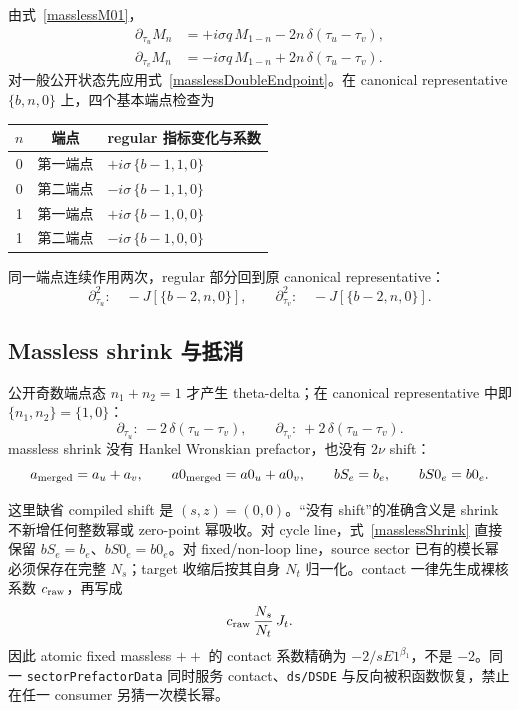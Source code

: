 ﻿\documentclass[a4paper,11pt]{article}
\begin{document}
由式~\eqref{masslessM01}，
\begin{align}
 \partial_{\tau_u}M_n
 &=+i\sigma q\,M_{1-n}
   -2n\,\delta(\tau_u-\tau_v),\\
 \partial_{\tau_v}M_n
 &=-i\sigma q\,M_{1-n}
   +2n\,\delta(\tau_u-\tau_v).
 \label{masslessTimeRules}
\end{align}
对一般公开状态先应用式~\eqref{masslessDoubleEndpoint}。在 canonical representative $\{b,n,0\}$ 上，四个基本端点检查为
\begin{center}
\begin{tabular}{ccl}
\toprule
$n$ & 端点 & regular 指标变化与系数\\
\midrule
0 & 第一端点 & $+i\sigma\,\{b-1,1,0\}$\\
0 & 第二端点 & $-i\sigma\,\{b-1,1,0\}$\\
1 & 第一端点 & $+i\sigma\,\{b-1,0,0\}$\\
1 & 第二端点 & $-i\sigma\,\{b-1,0,0\}$\\
\bottomrule
\end{tabular}
\end{center}
同一端点连续作用两次，regular 部分回到原 canonical representative：
\begin{equation}
 \partial_{\tau_u}^2:\quad
 -J[\{b-2,n,0\}],
 \qquad
 \partial_{\tau_v}^2:\quad
 -J[\{b-2,n,0\}].
\end{equation}

\subsection{Massless shrink 与抵消}

公开奇数端点态 $n_1+n_2=1$ 才产生 theta-delta；在 canonical representative 中即 $\{n_1,n_2\}=\{1,0\}$：
\begin{equation}
 \partial_{\tau_u}:\ -2\,\delta(\tau_u-\tau_v),
 \qquad
 \partial_{\tau_v}:\ +2\,\delta(\tau_u-\tau_v).
 \label{masslessDeltaSigns}
\end{equation}
massless shrink 没有 Hankel Wronskian prefactor，也没有 $2\nu$ shift：
\begin{equation}
 a_{\rm merged}=a_u+a_v,\qquad
 a0_{\rm merged}=a0_u+a0_v,\qquad
 bS_e=b_e,\qquad bS0_e=b0_e.
 \label{masslessShrink}
\end{equation}

这里缺省 compiled shift 是 $(s,z)=(0,0)$。“没有 shift”的准确含义是 shrink 不新增任何整数幂或 zero-point 幂吸收。对 cycle line，式~\eqref{masslessShrink} 直接保留 $bS_e=b_e$、$bS0_e=b0_e$。对 fixed/non-loop line，source sector 已有的模长幂必须保存在完整 $N_s$；target 收缩后按其自身 $N_t$ 归一化。contact 一律先生成裸核系数 $c_{\rm raw}$，再写成
\begin{equation}
 c_{\rm raw}\,\frac{N_s}{N_t}\,J_t.
\end{equation}
因此 atomic fixed massless $++$ 的 contact 系数精确为 $-2/sE1^{\beta_1}$，不是 $-2$。同一 \texttt{sectorPrefactorData} 同时服务 contact、\texttt{ds/DSDE} 与反向被积函数恢复，禁止在任一 consumer 另猜一次模长幂。
\end{document}
